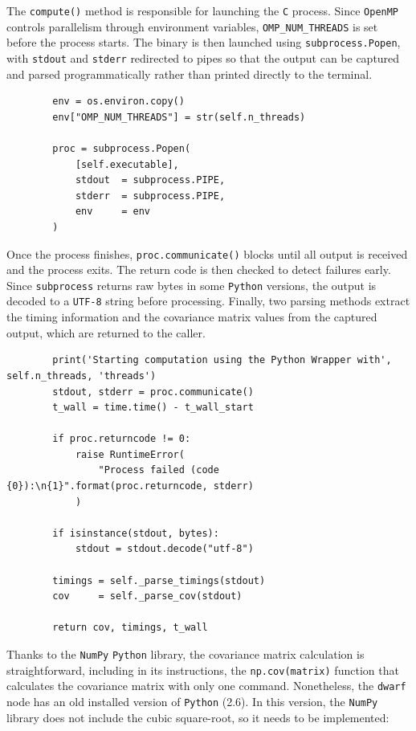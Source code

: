 The \texttt{compute()} method is responsible for launching the \texttt{C} 
process. Since \texttt{OpenMP} controls parallelism through environment variables, \texttt{OMP\_NUM\_THREADS} is set before the process starts. The binary is then launched using \texttt{subprocess.Popen}, with \texttt{stdout} and \texttt{stderr} redirected to pipes so that the output can be captured and parsed programmatically rather than printed directly to the terminal.

\begin{verbatim}
        env = os.environ.copy()
        env["OMP_NUM_THREADS"] = str(self.n_threads)

        proc = subprocess.Popen(
            [self.executable],
            stdout  = subprocess.PIPE,
            stderr  = subprocess.PIPE,
            env     = env
        )
\end{verbatim}

Once the process finishes, \texttt{proc.communicate()} blocks until all output 
is received and the process exits. The return code is then checked to detect 
failures early. Since \texttt{subprocess} returns raw bytes in some 
\texttt{Python} versions, the output is decoded to a \texttt{UTF-8} string 
before processing. Finally, two parsing methods extract the timing information 
and the covariance matrix values from the captured output, which are returned 
to the caller.

\begin{verbatim}
        print('Starting computation using the Python Wrapper with', self.n_threads, 'threads')
        stdout, stderr = proc.communicate()
        t_wall = time.time() - t_wall_start

        if proc.returncode != 0:
            raise RuntimeError(
                "Process failed (code {0}):\n{1}".format(proc.returncode, stderr)
            )

        if isinstance(stdout, bytes):
            stdout = stdout.decode("utf-8")

        timings = self._parse_timings(stdout)
        cov     = self._parse_cov(stdout)

        return cov, timings, t_wall
\end{verbatim}

Thanks to the \texttt{NumPy} \texttt{Python} library, the covariance matrix calculation is straightforward, including in its instructions, the \texttt{np.cov(matrix)} function that calculates the covariance matrix with only one command. Nonetheless, the \texttt{dwarf} node has an old installed version of \texttt{Python} (2.6). In this version, the \texttt{NumPy} library does not include the cubic square-root, so it needs to be implemented:

